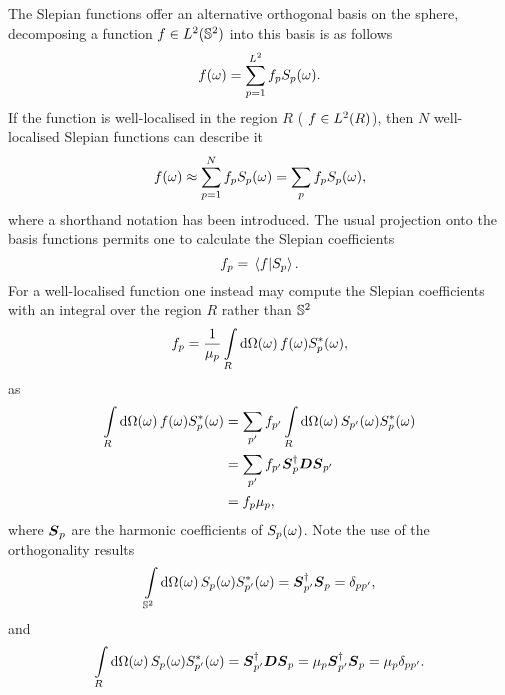 The Slepian functions offer an alternative orthogonal basis on the sphere, decomposing a function \(f \in \hilbert{\twoSphere}\) into this basis is as follows
%
\begin{equation}
	\pixel{f}
	= \sum\limits_{p=1}^{L^{2}} \slepian{f}\pixel{\slepian{S}}.
\end{equation}
%
If the function is well-localised in the region \(R\) (\ie{} \(f \in \hilbert{R}\)), then \(N\) well-localised Slepian functions can describe it
%
\begin{equation}\label{eq:chapter4_slepian_inverse}
	\pixel{f}
	\approx \sum\limits_{p=1}^{N} \slepian{f}\pixel{\slepian{S}} \\
	= \slepianSum \slepian{f}\pixel{\slepian{S}},
\end{equation}
%
where a shorthand notation has been introduced.
The usual projection onto the basis functions permits one to calculate the Slepian coefficients
%
\begin{equation}
	\slepian{f}
	= \braket*{f}{\slepian{S}}.
\end{equation}
%
For a well-localised function one instead may compute the Slepian coefficients with an integral over the region \(R\) rather than \(\twoSphere{}\)
%
\begin{equation}
	\slepian{f}
	= \frac{1}{\slepian{\mu}} \integrateRegion{\sphereVolume} \pixel{f} \pixel{\conj{\slepian{S}}},
\end{equation}
%
as
%
\begin{align}\label{eq:chapter4_integrate_region_proof}
	\integrateRegion{\sphereVolume} \pixel{f} \pixel{\conj{\slepian{S}}}
	 & = \slepianSum['] \slepian[']{f} \integrateRegion{\sphereVolume} \pixel{\slepian[']{S}} \pixel{\conj{\slepian{S}}} \nonumber \\
	 & = \slepianSum['] \slepian[']{f} \hermitian{\slepian{\vb*{S}}} \vb*{D} \slepian[']{\vb*{S}} \nonumber                        \\
	 & = \slepian{f} \slepian{\mu},
\end{align}
%
where \(\slepian{\vb*{S}}\) are the harmonic coefficients of \(\pixel{\slepian{S}}\).
Note the use of the orthogonality results
%
\begin{equation}\label{eq:chapter4_orthogonality_sphere}
	\integrateSphere{\omega} \pixel{\slepian{S}} \pixel{\conj{\slepian[']{S}}}
	= \hermitian{\slepian[']{\vb*{S}}} \slepian{\vb*{S}}
	= \delta_{pp'},
\end{equation}
%
and
%
\begin{equation}
	\integrateRegion{\sphereVolume} \pixel{\slepian{S}} \pixel{\conj{\slepian[']{S}}}
	= \hermitian{\slepian[']{\vb*{S}}} \vb*{D} \slepian{\vb*{S}}
	= \slepian{\mu} \hermitian{\slepian[']{\vb*{S}}} \slepian{\vb*{S}}
	= \slepian{\mu} \delta_{pp'}.
\end{equation}

